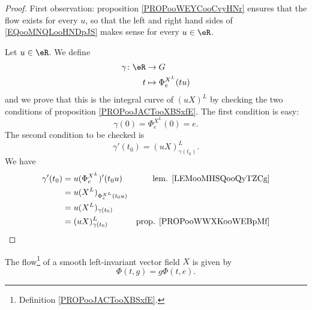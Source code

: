 \begin{proof}
	First observation: proposition \ref{PROPooWEYCooCvyHNr} ensures that the flow exists for every \( u\), so that the left and right hand sides of \eqref{EQooMNQLooHNDpJS} makes sense for every \( u\in \eR\).

	Let \( u\in \eR\). We define
	\begin{equation}
		\begin{aligned}
			\gamma\colon \eR & \to G                    \\
			t                & \mapsto \Phi_e^{X^L}(tu)
		\end{aligned}
	\end{equation}
	and we prove that this is the integral curve of \( (uX)^L\) by checking the two conditions of proposition \ref{PROPooJACTooXBSxfE}. The first condition is easy:
	\begin{equation}
		\gamma(0)=\Phi_e^{X^L}(0)=e.
	\end{equation}
	The second condition to be checked is
	\begin{equation}
		\gamma'(t_0)=(uX)^L_{\gamma(t_0)}.
	\end{equation}
	We have
	\begin{subequations}
		\begin{align}
			\gamma'(t_0) & =u(\Phi^{X^L}_e)'(t_0u)      & \text{lem. \ref{LEMooMHSQooQyTZCg}}   \\
			             & =u(X^L)_{\Phi_e^{X^L}(t_0u)}                                         \\
			             & =u(X^L)_{\gamma(t_0)}                                                \\
			             & =(uX)^L_{\gamma(t_0)}        & \text{prop. \ref{PROPooWWXKooWEBpMf}}
		\end{align}
	\end{subequations}
\end{proof}

\begin{proposition} \label{PROPooUXFQooIwimav}
	The flow\footnote{Definition \ref{PROPooJACTooXBSxfE}.} of a smooth left-invariant vector field \( X\) is given by
	\begin{equation}
		\Phi(t,g)=g\Phi(t,e).
	\end{equation}
\end{proposition}

